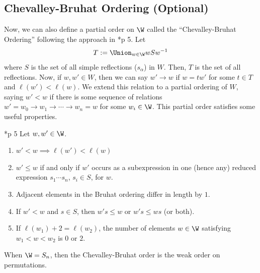 \documentclass[11pt,leqno,oneside]{amsart}
\numberwithin{thm}{section}
\begin{document}
\subsection{Chevalley-Bruhat Ordering (Optional)}
Now, we can also define a partial order on $\W$ called the
``Chevalley-Bruhat Ordering'' following the approach in
\cite{cat-o}*{p 5}. Let \[
  T := \Union_{w \in \W} wSw^{-1}
\]
where $S$ is the set of all simple reflections ($s_\alpha$) in
$W$. Then, $T$ is the set of all reflections. Now, if $w,w' \in W$,
then we can say $w' \to w$ if $w = tw'$ for some $t \in T$ and $\ell(w') <
\ell(w)$. We extend this relation to a partial ordering of $W$, saying
$w' < w$ if
there is some sequence of relations $w'=w_0 \to w_1 \to \cdots \to
w_n=w$ for some $w_i \in \W$. This partial order satisfies some
useful properties.
\begin{prop}
  \cite{cat-o}*{p 5} Let $w,w' \in \W$.
  \begin{enumerate}
  \item \(w' < w \implies \ell(w') < \ell(w)\)
  \item \(w' \leq w\) if and only if \(w'\) occurs as a subexpression
    in one (hence any) reduced expression \(s_1 \cdots s_n\), \(s_i \in
    S\), for \(w\).
  \item Adjacent elements in the Bruhat ordering differ in length by
    \(1\).
  \item If \(w' < w\) and \(s \in S\), then \(w's \leq w\) or \(w's
    \leq ws\) (or both).
  \item If \(\ell(w_1)+2 = \ell(w_2)\), the number of elements \(w \in
    \W\) satisfying \(w_1 < w < w_2\) is \(0\) or \(2\).
  \end{enumerate}
\end{prop}
\begin{rmk}
  When \(\W = S_n\), then the Chevalley-Bruhat order is the weak order
  on permutations.
\end{rmk}
\end{document}
